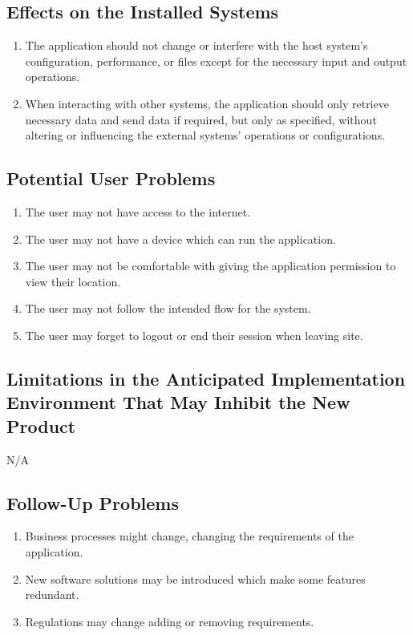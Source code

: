 \documentclass[12pt]{article}
\begin{document}
\subsection{Effects on the Installed Systems}
\begin{enumerate} 
  \item The application should not change or interfere with the host system's configuration, performance, or files except for the necessary input and output operations.
  \item When interacting with other systems, the application should only retrieve necessary data and send data if required, but only as specified, without altering or influencing the external systems' operations or configurations.
\end{enumerate}
\subsection{Potential User Problems}
\begin{enumerate} 
  \item The user may not have access to the internet.
  \item The user may not have a device which can run the application.
  \item The user may not be comfortable with giving the application permission to view their location.
  \item The user may not follow the intended flow for the system.
  \item The user may forget to logout or end their session when leaving site.
\end{enumerate}
\subsection{Limitations in the Anticipated Implementation Environment That May
Inhibit the New Product}
N/A
\subsection{Follow-Up Problems}
\begin{enumerate}
  \item Business processes might change, changing the requirements of the application.
  \item New software solutions may be introduced which make some features redundant.
  \item Regulations may change adding or removing requirements.
\end{enumerate}
\end{document}

